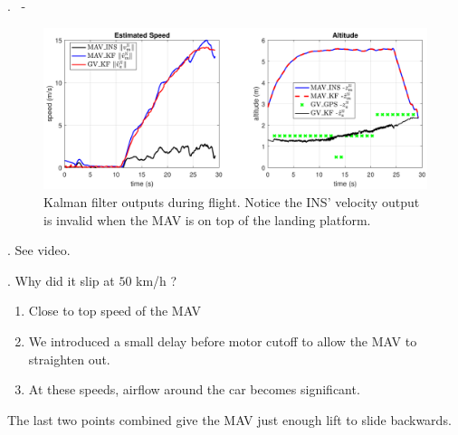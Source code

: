 
\begin{frame}{\thesection. \insertsection \ - \insertsubsection}
	\begin{figure}
		\includegraphics[width=0.8\paperwidth]{figures/landing_motion.pdf}
		\caption{Kalman filter outputs during flight. Notice the INS' velocity output is invalid
		when the MAV is on top of the landing platform.}
	\end{figure}
\end{frame}


\begin{frame}{\thesection. \insertsection}
	See video.
\end{frame}


\begin{frame}{\thesection. \insertsection}	
	Why did it slip at $50$ km/h ?
	\begin{enumerate}
		\item Close to top speed of the MAV 
		\item We introduced a small delay before motor cutoff to allow the MAV to straighten out.
		\item At these speeds, airflow around the car becomes significant.
	\end{enumerate}
	The last two points combined give the MAV just enough lift to slide backwards.
\end{frame}